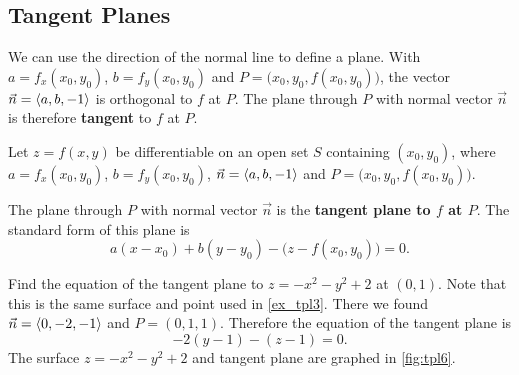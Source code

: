 \subsection{Tangent Planes}

We can use the direction of the normal line to define a plane. With $a=f_x(x_0,y_0)$, $b=f_y(x_0,y_0)$ and $P = \bigl(x_0,y_0,f(x_0,y_0)\bigr)$, the vector $\vec n=\left\langle a,b,-1\right\rangle$ is orthogonal to $f$ at $P$. The plane through $P$ with normal vector $\vec n$ is therefore \textbf{tangent} to $f$ at $P$.

\begin{definition}\label{def:tangent_plane}%
Let $z=f(x,y)$ be differentiable on an open set $S$ containing $(x_0,y_0)$, where
$a = f_x(x_0,y_0)$, $b=f_y(x_0,y_0)$, $\vec n=\left\langle a,b,-1\right\rangle$ and $P=\bigl(x_0,y_0,f(x_0,y_0)\bigr)$.\bigskip

The plane through $P$ with normal vector $\vec n$ is the \textbf{tangent plane to $f$ at $P$}. The standard form of this plane is 
\[a(x-x_0) + b(y-y_0) - \bigl(z-f(x_0,y_0)\bigr) = 0.\]
\end{definition}

\begin{example}\label{ex_tpl6}%
Find the equation of the tangent plane to $z=-x^2-y^2+2$ at $(0,1)$.
\solution
Note that this is the same surface and point used in \autoref{ex_tpl3}.
%
%
There we found $\vec n =\left\langle 0,-2,-1\right\rangle$ and $P = (0,1,1)$. Therefore the equation of the tangent plane is
\[-2(y-1)-(z-1)=0.\]
The surface $z=-x^2-y^2+2$ and tangent plane are graphed in \autoref{fig:tpl6}.
\end{example}


